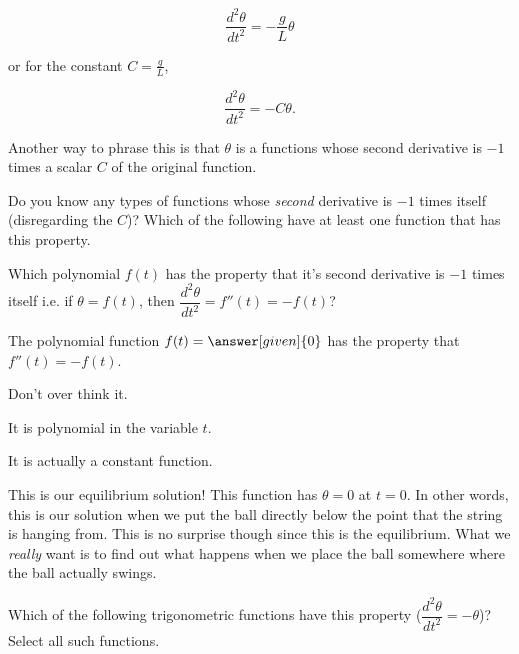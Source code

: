 \documentclass[handout,nooutcomes]{ximera}
\begin{document}
\begin{example}
\begin{explanation}
\[
\dfrac{d^2 \theta}{d t^2}  = -\dfrac{g}{L} \theta
\]

or for the constant $C=\frac{g}{L}$,

\[
\dfrac{d^2 \theta}{d t^2}  = -C\theta.
\]

Another way to phrase this is that $\theta$ is a functions whose
second derivative is $-1$ times a scalar $C$ of the original function.

\begin{question}
Do you know any types of functions whose \emph{second} derivative
is $-1$ times itself (disregarding the $C$)? Which of the following have at least one function that has this property.

\begin{selectAll}
\end{selectAll}
\end{question}

\begin{question}
Which polynomial $f(t)$ has the property that it's second
derivative is $-1$ times itself i.e. if
$\theta=f(t)$, then $\dfrac{d^2 \theta}{d t^2} = f''(t) = -f(t)$?

\begin{prompt}
The polynomial function $f(t) = \answer[given]{0}$ has the property that $f''(t) = -f(t)$.
\end{prompt}
\begin{hint}
Don't over think it.
\end{hint}
\begin{hint}
It is polynomial in the variable $t$.
\end{hint}
\begin{hint}
It is actually a constant function.
\end{hint}
\end{question}

This is our equilibrium solution! This function has $\theta=0$ at $t=0$. In other
words, this is our solution when we put the ball directly below the point
that the string is hanging from. This is no surprise though since this
is the equilibrium. What we \emph{really} want is to find out what happens
when we place the ball somewhere where the ball actually swings.

\begin{question}
Which of the following trigonometric functions have this property
($\dfrac{d^2 \theta}{d t^2} = -\theta$)? Select all such functions.
\begin{selectAll}
\end{selectAll}
\end{question}


\end{explanation}
\end{example}
\end{document}
